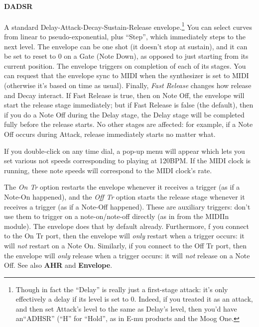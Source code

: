 \documentclass{article}
\begin{document}
\paragraph{DADSR}  A standard Delay-Attack-Decay-Sustain-Release envelope.\footnote{Though in fact the ``Delay'' is really just a first-stage attack: it's only effectively a delay if its level is set to 0.  Indeed, if you treated it as an attack, and then set Attack's level to the same as Delay's level, then you'd have an``ADHSR'' (``H'' for ``Hold'', as in E-mu products and the Moog One.} You can select curves from linear to pseudo-exponential, plus ``Step'', which immediately steps to the next level.  The envelope can be one shot (it doesn't stop at sustain), and it can be set to reset to 0 on a Gate (Note Down), as opposed to just starting from its current position.  The envelope triggers on completion of each of its stages.  You can request that the envelope sync to MIDI when the synthesizer is set to MIDI (otherwise it's based on time as usual).  Finally, {\it Fast Release} changes how release and Decay interact.  If Fast Release is true, then on Note Off, the envelope will start the release stage immediately; but if Fast Release is false (the default), then if you do a Note Off during the Delay stage, the Delay stage will be completed fully before the release starts.  No other stages are affected: for example, if a Note Off occurs during Attack, release immediately starts no matter what.

If you double-click on any time dial, a pop-up menu will appear which lets you set various not speeds corresponding to playing at 120BPM.  If the MIDI clock is running, these note speeds will correspond to the MIDI clock's rate.

The {\it On Tr} option restarts the envelope whenever it receives a trigger (as if a Note-On happened), and the {\it Off Tr} option starts the release stage whenever it receives a trigger (as if a Note-Off happened).  These are auxiliary triggers: don't use them to trigger on a note-on/note-off directly (as in from the MIDIIn module).  The envelope does that by default already.  Furthermore, f you connect to the On Tr port, then the envelope will {\it only} restart when a trigger occurs: it will {\it not} restart on a Note On.  Similarly, if you connect to the Off Tr port, then the envelope will {\it only} release when a trigger occurs: it will {\it not} release on a Note Off.  See also {\bf AHR} and {\bf Envelope}.
 
\end{document}
